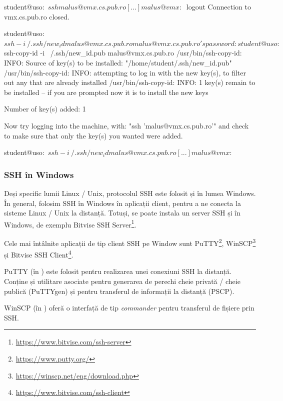 \begin{screen}[caption={Autentificarea SSH cu cheie publică},label={lst:sec:ssh-pub-auth}]
student@uso:~$ ssh malus@vmx.cs.pub.ro
[...]
malus@vmx:~$ logout
Connection to vmx.cs.pub.ro closed.

student@uso:~$ ssh -i ~/.ssh/new_id malus@vmx.cs.pub.ro
malus@vmx.cs.pub.ro's password:

student@uso:~$ ssh-copy-id -i ~/.ssh/new_id.pub malus@vmx.cs.pub.ro
/usr/bin/ssh-copy-id: INFO: Source of key(s) to be installed: "/home/student/.ssh/new_id.pub"
/usr/bin/ssh-copy-id: INFO: attempting to log in with the new key(s), to filter out any that are already installed
/usr/bin/ssh-copy-id: INFO: 1 key(s) remain to be installed -- if you are prompted now it is to install the new keys

Number of key(s) added: 1

Now try logging into the machine, with:   "ssh 'malus@vmx.cs.pub.ro'"
and check to make sure that only the key(s) you wanted were added.

student@uso:~$ ssh -i ~/.ssh/new_id malus@vmx.cs.pub.ro
[...]
malus@vmx:~$
\end{screen}

\subsubsection{SSH în Windows}
\label{sec:sec:transfer:ssh:windows}

Deși specific lumii Linux / Unix, protocolul SSH este folosit și în lumea Windows.
În general, folosim SSH în Windows în aplicații client, pentru a ne conecta la sisteme Linux / Unix la distanță.
Totuși, se poate instala un server SSH și în Windows, de exemplu Bitvise SSH Server\footnote{\url{https://www.bitvise.com/ssh-server}}.

Cele mai întâlnite aplicații de tip client SSH pe Window sunt PuTTY\footnote{\url{https://www.putty.org/}}, WinSCP\footnote{\url{https://winscp.net/eng/download.php}} și Bitvise SSH Client\footnote{\url{https://www.bitvise.com/ssh-client}}.

PuTTY (în ) este folosit pentru realizarea unei conexiuni SSH la distanță.
Conține și utilitare asociate pentru generarea de perechi cheie privată / cheie publică (PuTTYgen) și pentru transferul de informații la distanță (PSCP).

WinSCP (în ) oferă o interfață de tip \textit{commander} pentru transferul de fișiere prin SSH.

